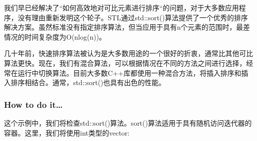 
我们早已经解决了“如何高效地对可比元素进行排序“的问题，对于大多数应用程序，没有理由重新发明这个轮子。STL通过std::sort()算法提供了一个优秀的排序解决方案。虽然标准没有指定排序算法，但当应用于具有n个元素的范围时，最差情况的时间复杂度为O(nlog(n))。

几十年前，快速排序算法被认为是大多数用途的一个很好的折衷，通常比其他可比算法更快。现在，我们有混合算法，可以根据情况在不同的方法之间进行选择，经常在运行中切换算法。目前大多数C++库都使用一种混合方法，将插入排序和插入排序相结合。通常，std::sort()也具有出色的性能。

\subsubsection{How to do it…}

这个示例中，我们将检查std::sort()算法。sort()算法适用于具有随机访问迭代器的容器。这里，我们将使用int类型的vector:

